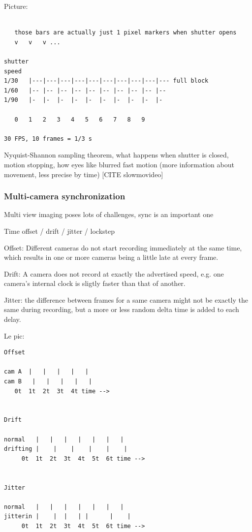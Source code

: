Picture:

\begin{verbatim}

   those bars are actually just 1 pixel markers when shutter opens
   v   v   v ...

shutter
speed
1/30   |---|---|---|---|---|---|---|---|---|--- full block
1/60   |-- |-- |-- |-- |-- |-- |-- |-- |-- |--
1/90   |-  |-  |-  |-  |-  |-  |-  |-  |-  |-

   0   1   2   3   4   5   6   7   8   9

30 FPS, 10 frames = 1/3 s
\end{verbatim}

Nyquist-Shannon sampling theorem, what happens when shutter is closed, motion stopping, how eyes like blurred fast motion (more information about movement, less precise by time) [CITE slowmovideo]


\subsubsection{Multi-camera synchronization} %

Multi view imaging poses lots of challenges, sync is an important one

Time offset / drift / jitter / lockstep

Offset: Different cameras do not start recording immediately at the same time, which results in one or more cameras being a little late at every frame.

Drift: A camera does not record at exactly the advertised speed, e.g. one camera's internal clock is sligtly faster than that of another.

Jitter: the difference between frames for a same camera might not be exactly the same during recording, but a more or less random delta time is added to each delay.

Le pic:

\begin{verbatim}
Offset

cam A  |   |   |   |   |
cam B   |   |   |   |   |
   0t  1t  2t  3t  4t time -->


Drift

normal   |   |   |   |   |   |   |
drifting |    |    |    |    |    |
	 0t  1t  2t  3t  4t  5t  6t time -->


Jitter

normal   |   |   |   |   |   |   |
jitterin |    |  |   | |      |    |
	 0t  1t  2t  3t  4t  5t  6t time -->
\end{verbatim}

